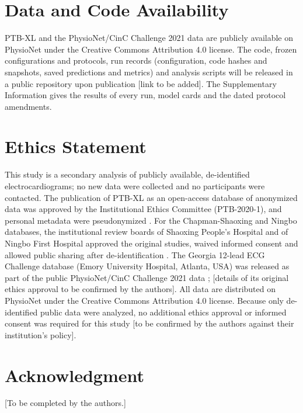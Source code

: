 \documentclass[journal]{IEEEtran}
\begin{document}
\section*{Data and Code Availability}
PTB-XL and the PhysioNet/CinC Challenge 2021 data are publicly available on PhysioNet under the Creative Commons Attribution 4.0 license. The code, frozen configurations and protocols, run records (configuration, code hashes and snapshots, saved predictions and metrics) and analysis scripts will be released in a public repository upon publication [link to be added]. The Supplementary Information gives the results of every run, model cards and the dated protocol amendments.

\section*{Ethics Statement}
This study is a secondary analysis of publicly available, de-identified electrocardiograms; no new data were collected and no participants were contacted. The publication of PTB-XL as an open-access database of anonymized data was approved by the Institutional Ethics Committee (PTB-2020-1), and personal metadata were pseudonymized \cite{wagner2020ptbxl}. For the Chapman-Shaoxing and Ningbo databases, the institutional review boards of Shaoxing People's Hospital and of Ningbo First Hospital approved the original studies, waived informed consent and allowed public sharing after de-identification \cite{zheng2020chapman,zheng2022ningbo}. The Georgia 12-lead ECG Challenge database (Emory University Hospital, Atlanta, USA) was released as part of the public PhysioNet/CinC Challenge 2021 data \cite{reyna2021challenge,reyna2022challengedata}; [details of its original ethics approval to be confirmed by the authors]. All data are distributed on PhysioNet under the Creative Commons Attribution 4.0 license. Because only de-identified public data were analyzed, no additional ethics approval or informed consent was required for this study [to be confirmed by the authors against their institution's policy].

\section*{Acknowledgment}
[To be completed by the authors.]



\end{document}
